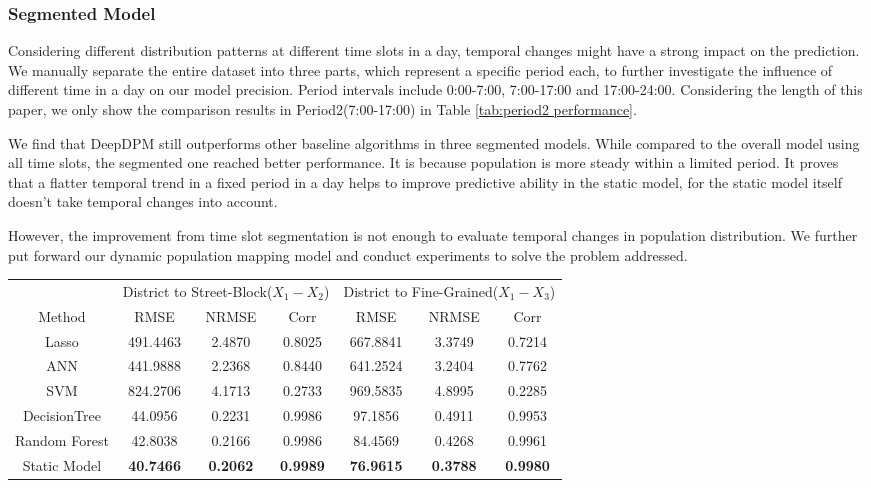 \documentclass[letterpaper]{article} %
\begin{document}
\subsubsection{Segmented Model}

Considering different distribution patterns at different time slots in a day, temporal changes might have a strong impact on the prediction. We manually separate the entire dataset into three parts, which represent a specific period each, to further investigate the influence of different time in a day on our model precision. Period intervals include 0:00-7:00, 7:00-17:00 and 17:00-24:00. Considering the length of this paper, we only show the comparison results in Period2(7:00-17:00) in Table \ref{tab:period2 performance}.

We find that DeepDPM still outperforms other baseline algorithms in three segmented models. While compared to the overall model using all time slots, the segmented one reached better performance. It is because population is more steady within a limited period. It proves that a flatter temporal trend in a fixed period in a day helps to improve predictive ability in the static model, for the static model itself doesn't take temporal changes into account. 

However, the improvement from time slot segmentation is not enough to evaluate temporal changes in population distribution. We further put forward our dynamic population mapping model and conduct experiments to solve the problem addressed. 


\begin{table*}[htb]
\small
\begin{center}
\begin{tabular}{ccccccc}
\toprule
 & \multicolumn{3}{c}{District to Street-Block($X_1-X_2$)} & 
\multicolumn{3}{c}{District to Fine-Grained($X_1-X_3$)}\\
Method&RMSE&NRMSE&Corr&RMSE&NRMSE&Corr\\
\midrule
Lasso &491.4463&2.4870&0.8025&667.8841&3.3749&0.7214\\
ANN &441.9888&2.2368&0.8440&641.2524&3.2404&0.7762\\
SVM&824.2706 &4.1713 &0.2733&969.5835 &4.8995 &0.2285\\
DecisionTree&44.0956&0.2231&0.9986&97.1856&0.4911&0.9953\\
Random Forest&42.8038 &0.2166 &0.9986&84.4569 &0.4268 &0.9961\\
Static Model
&\textbf{40.7466}&\textbf{0.2062}&\textbf{0.9989}
&\textbf{76.9615}&\textbf{0.3788}&\textbf{0.9980}\\
\bottomrule
\end{tabular}
\caption{Comparison of predictive ability between all six methods for time slots in period 2, from 7:00 to 17:00 every day.}
\label{tab:period2 performance}
\end{center}
\end{table*}
\end{document}
